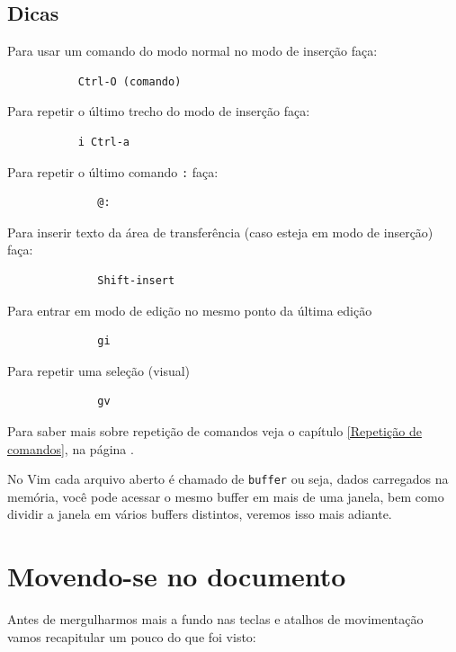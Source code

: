 \documentclass[10pt,a4paper,openany]{book}
\begin{document}
\section{Dicas}
\label{Dicas}
Para usar um comando do modo normal no modo de inserção faça:

\begin{verbatim}
		   Ctrl-O (comando)
\end{verbatim}

Para repetir o último trecho do modo de inserção faça:

\begin{verbatim}
		   i Ctrl-a
\end{verbatim}

Para repetir o último comando \verb+:+ faça:

\begin{verbatim}
			  @:
\end{verbatim}

Para inserir texto da área de transferência (caso esteja em modo de inserção) faça:

\begin{verbatim}
			  Shift-insert
\end{verbatim}

Para entrar em modo de edição no mesmo ponto da última edição

\begin{verbatim}
			  gi
\end{verbatim}

Para repetir uma seleção (visual)

\begin{verbatim}
			  gv
\end{verbatim}

Para saber mais sobre repetição de comandos veja o capítulo \ref{Repetição de comandos},
na página \pageref{Repetição de comandos}.

No Vim cada arquivo aberto é chamado de \verb|buffer| ou seja, dados
carregados na memória, você pode acessar o mesmo buffer em mais de uma
janela, bem como dividir a janela em vários buffers distintos, veremos
isso mais adiante.

\chapter{Movendo-se no documento}\label{cha:Movendo-se no documento}

Antes de mergulharmos mais a fundo nas teclas e atalhos de
movimentação vamos recapitular um pouco do que foi visto: \\
\end{document}
